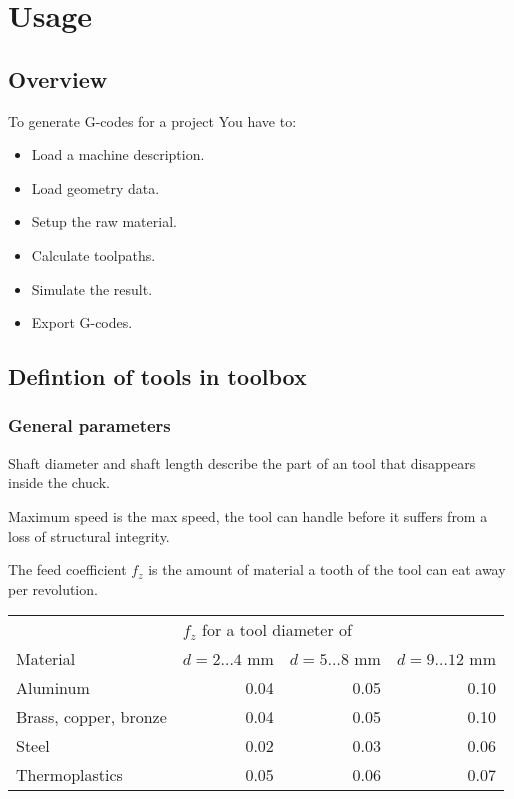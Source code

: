 \chapter{Usage}

\section{Overview}

To generate G-codes for a project You have to:

\begin{itemize}
\item Load a machine description.
\item Load geometry data.
\item Setup the raw material.
\item Calculate toolpaths.
\item Simulate the result.
\item Export G-codes.
\end{itemize}

\section{Defintion of tools in toolbox}

\subsection{General parameters}

Shaft diameter and shaft length describe the part of an tool that
disappears inside the chuck. 

Maximum speed is the max speed, the tool can handle  before it suffers
from a loss of structural integrity.

The feed coefficient $f_z$ is the amount of material a tooth of the tool
can eat away per revolution. 

\begin{table}[htb]
\begin{tabular}{|l|r|r|r|}
\hline
&\multicolumn{3}{|l|}{$f_z$ for a tool diameter of}\\
Material&$d=2\ldots4$ mm&$d=5\ldots8$ mm&$d=9\ldots12$ mm\\
\hline
Aluminum&0.04&0.05&0.10\\
Brass, copper, bronze&0.04&0.05&0.10\\
Steel&0.02&0.03&0.06\\
Thermoplastics&0.05&0.06&0.07\\
\hline
\end{tabular}
\end{table}


